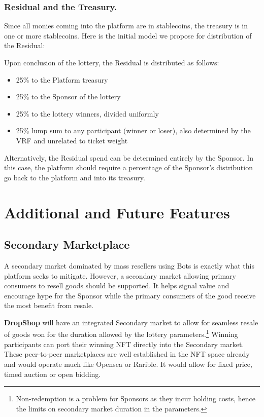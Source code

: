 \documentclass[runningheads]{llncs}
\begin{document}
\subsubsection{Residual and the Treasury.}  Since all monies coming into the platform are in stablecoins, the treasury is in one or more stablecoins.  Here is the initial model we propose for distribution of the Residual:

\noindent Upon conclusion of the lottery, the Residual is distributed as follows:
\begin{itemize}
\item 25\% to the Platform treasury
\item 25\% to the Sponsor of the lottery
\item 25\% to the lottery winners, divided uniformly
\item 25\% lump sum to any participant (winner or loser), also determined by the VRF and unrelated to ticket weight
\end{itemize}

Alternatively, the Residual spend can be determined entirely by the Sponsor.  In this case, the platform should require a percentage of the Sponsor’s distribution go back to the platform and into its treasury. 


\section{Additional and Future Features}\label{section-FutureFeaturesGrowth}

\subsection{Secondary Marketplace}
A secondary market dominated by mass resellers using Bots is exactly what this platform seeks to mitigate.  However, a secondary market allowing primary consumers to resell goods should be supported.  It helps signal value and encourage hype for the Sponsor while the primary consumers of the good receive the most benefit from resale. 

\textbf{DropShop} will have an integrated Secondary market to allow for seamless resale of goods won for the duration allowed by the lottery parameters.\footnote{Non-redemption is a problem for Sponsors as they incur holding costs, hence the limits on secondary market duration in the parameters.}   Winning participants can port their winning NFT directly into the Secondary market.  These peer-to-peer marketplaces are well established in the NFT space already and would operate much like Opensea or Rarible.  It would allow for fixed price, timed auction or open bidding.
\end{document}
